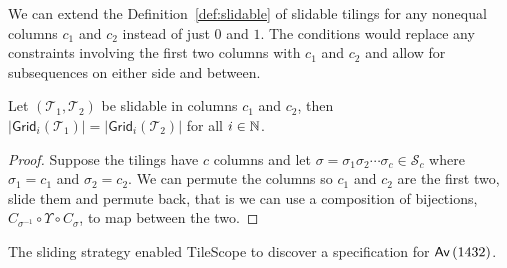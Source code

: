 We can extend the Definition~\ref{def:slidable} of slidable tilings for any nonequal columns $c_1$ and $c_2$ instead of just $0$ and $1$. The conditions would replace any constraints involving the first two columns with $c_1$ and $c_2$ and allow for subsequences on either side and between.

\begin{proposition}
Let $(\mathcal{T}_1,\mathcal{T}_2)$ be slidable in columns $c_1$ and $c_2$, then $|\textsf{Grid}_i(\mathcal{T}_1)| = |\textsf{Grid}_i(\mathcal{T}_2)|$ for all $i\in\mathbb{N}$.
\end{proposition}
\begin{proof}
Suppose the tilings have $c$ columns and let $\sigma = \sigma_1\sigma_2 \cdots \sigma_c \in \mathcal{S}_c$ where $\sigma_1 = c_1$ and $\sigma_2 = c_2$. We can permute the columns so $c_1$ and $c_2$ are the first two, slide them and permute back, that is we can use a composition of bijections, $C_{\sigma^{-1}} \circ \Upsilon \circ C_\sigma$, to map between the two.
\end{proof}

The sliding strategy enabled TileScope to discover a specification for $\textsf{Av}\left(1432\right)$.